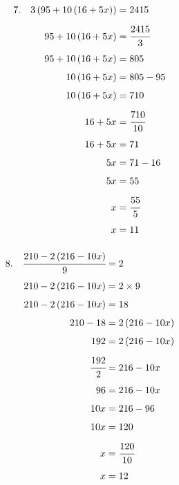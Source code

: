 \documentclass{article}
\begin{document}
\noindent
\begin{minipage}[t]{0.5000\textwidth}
\begin{align*}
7.\hspace{10pt}3\left(95+10\left(16+5x\right)\right)&=2415\\[4pt]
95+10\left(16+5x\right)&=\cfrac{2415}{3}\\[4pt]
95+10\left(16+5x\right)&=805\\[4pt]
10\left(16+5x\right)&=805-95\\[4pt]
10\left(16+5x\right)&=710\\[4pt]
16+5x&=\cfrac{710}{10}\\[4pt]
16+5x&=71\\[4pt]
5x&=71-16\\[4pt]
5x&=55\\[4pt]
x&=\cfrac{55}{5}\\[4pt]
x&=11\\[4pt]
\end{align*}
\end{minipage}
\begin{minipage}[t]{0.5000\textwidth}
\begin{align*}
8.\hspace{10pt}\cfrac{210-2\left(216-10x\right)}{9}&=2\\[4pt]
210-2\left(216-10x\right)&=2\times9\\[4pt]
210-2\left(216-10x\right)&=18\\[4pt]
210-18&=2\left(216-10x\right)\\[4pt]
192&=2\left(216-10x\right)\\[4pt]
\cfrac{192}{2}&=216-10x\\[4pt]
96&=216-10x\\[4pt]
10x&=216-96\\[4pt]
10x&=120\\[4pt]
x&=\cfrac{120}{10}\\[4pt]
x&=12\\[4pt]
\end{align*}
\end{minipage}
\vspace{10 mm}
\end{document}
